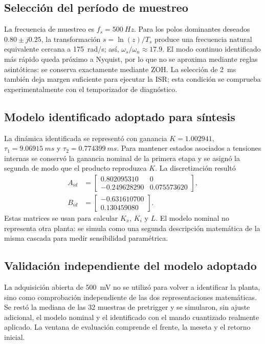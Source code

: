 \documentclass[conference]{IEEEtran}
\begin{document}
\subsection{Selección del período de muestreo}
La frecuencia de muestreo es $f_s=\SI{500}{Hz}$. Para los polos dominantes deseados $0.80\pm j0.25$, la transformación $s=\ln(z)/T_s$ produce una frecuencia natural equivalente cercana a \SI{175}{rad/s}; así, $\omega_s/\omega_n\approx17.9$. El modo continuo identificado más rápido queda próximo a Nyquist, por lo que no se aproxima mediante reglas asintóticas: se conserva exactamente mediante ZOH. La selección de \SI{2}{ms} también deja margen suficiente para ejecutar la ISR; esta condición se comprueba experimentalmente con el temporizador de diagnóstico.

\subsection{Modelo identificado adoptado para síntesis}
La dinámica identificada se representó con ganancia $K=1.002941$, $\tau_1=\SI{9.06915}{ms}$ y $\tau_2=\SI{0.774399}{ms}$. Para mantener estados asociados a tensiones internas se conservó la ganancia nominal de la primera etapa y se asignó la segunda de modo que el producto reproduzca $K$. La discretización resultó
\begin{align}
A_{id}&=\begin{bmatrix}0.802095310&0\\-0.249628290&0.075573620\end{bmatrix},\\
B_{id}&=\begin{bmatrix}-0.631610700\\0.130459080\end{bmatrix}.
\end{align}
Estas matrices se usan para calcular $K_x$, $K_i$ y $L$. El modelo nominal no representa otra planta: se simula como una segunda descripción matemática de la misma cascada para medir sensibilidad paramétrica.

\subsection{Validación independiente del modelo adoptado}
La adquisición abierta de \SI{500}{mV} no se utilizó para volver a identificar la planta, sino como comprobación independiente de las dos representaciones matemáticas. Se restó la mediana de las 32 muestras de pretrigger y se simularon, sin ajuste adicional, el modelo nominal y el identificado con el mando cuantizado realmente aplicado. La ventana de evaluación comprende el frente, la meseta y el retorno inicial.
\end{document}
